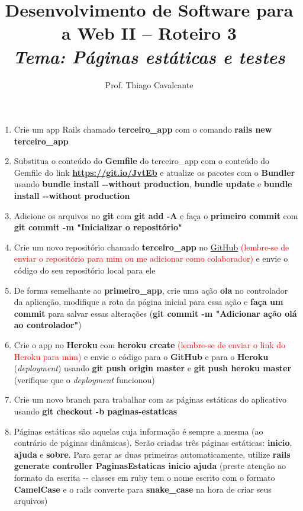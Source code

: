 \documentclass[a4paper,12pt]{article}
\title{Desenvolvimento de Software para a Web II -- Roteiro 3 \\
\Large \textit{Tema: Páginas estáticas e testes}}
\author{Prof. Thiago Cavalcante}
\date{}
\begin{document}
\maketitle

\sloppy
\raggedright

\begin{enumerate}
  \item Crie um app Rails chamado \textbf{terceiro\_app} com o comando \textbf{rails new terceiro\_app}
  \item Substitua o conteúdo do \textbf{Gemfile} do terceiro\_app com o conteúdo do Gemfile do link \textbf{\href{https://git.io/JvtEb}{https://git.io/JvtEb}} e atualize os pacotes com o \textbf{Bundler} usando \textbf{bundle install {-}-without production}, \textbf{bundle update} e \textbf{bundle install {-}-without production}
  \item Adicione os arquivos no \textbf{git} com \textbf{git add -A} e faça o \textbf{primeiro commit} com \textbf{git commit -m "Inicializar o repositório"}
  \item Crie um novo repositório chamado \textbf{terceiro\_app} no \href{https://www.github.com}{GitHub} \textcolor{red}{(lembre-se de enviar o repositório para mim ou me adicionar como colaborador)} e envie o código do seu repositório local para ele
  \item De forma semelhante ao \textbf{primeiro\_app}, crie uma ação \textbf{ola} no controlador da aplicação, modifique a rota da página inicial para essa ação e \textbf{faça um commit} para salvar essas alterações (\textbf{git commit -m "Adicionar ação olá ao controlador"})
  \item Crie o app no \textbf{Heroku} com \textbf{heroku create} \textcolor{red}{(lembre-se de enviar o link do Heroku para mim)} e envie o código para o \textbf{GitHub} e para o \textbf{Heroku} (\textit{deployment}) usando \textbf{git push origin master} e \textbf{git push heroku master} (verifique que o \textit{deployment} funcionou)
  \item Crie um novo branch para trabalhar com as páginas estáticas do aplicativo usando \textbf{git checkout -b paginas-estaticas}
  \item Páginas estáticas são aquelas cuja informação é sempre a mesma (ao contrário de páginas dinâmicas). Serão criadas três páginas estáticas: \textbf{inicio}, \textbf{ajuda} e \textbf{sobre}. Para gerar as duas primeiras automaticamente, utilize \textbf{rails generate controller PaginasEstaticas inicio ajuda} (preste atenção ao formato da escrita {-}- classes em ruby tem o nome escrito com o formato \textbf{CamelCase} e o rails converte para \textbf{snake\_case} na hora de criar seus arquivos)

\end{enumerate}
\end{document}
